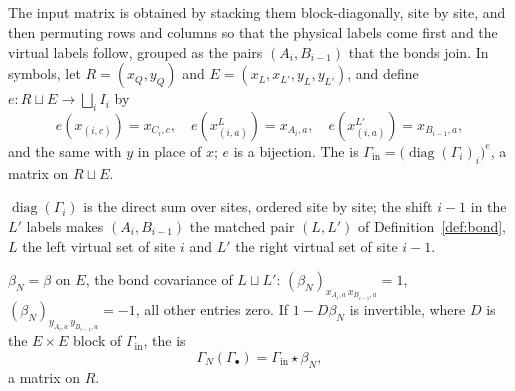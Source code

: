 \subsection{}
\begin{definition}\label{def:input}
 The input
matrix is obtained by stacking them block-diagonally, site by site, and then permuting
rows and columns so that the physical labels come first and the virtual labels follow,
grouped as the pairs $(A_i,B_{i-1})$ that the bonds join. In symbols, let
$R=(x_Q,y_Q)$ and $E=(x_L,x_{L'},y_L,y_{L'})$, and define $e:R\sqcup E\to\bigsqcup_iI_i$ by
\[
 e(x_{(i,c)})=x_{C_i,c},\quad e(x_{(i,a)}^{L})=x_{A_i,a},\quad e(x_{(i,a)}^{L'})=x_{B_{i-1},a},
\]
and the same with $y$ in place of $x$; $e$ is a bijection. The \emph{}
is $\Gamma_{\mathrm{in}}=\bigl(\operatorname{diag}(\Gamma_i)_{i}\bigr)^{e}$, a matrix
on $R\sqcup E$.
\end{definition}
$\operatorname{diag}(\Gamma_i)$ is the direct sum over sites, ordered site by site; the
shift $i-1$ in the $L'$ labels makes $(A_i,B_{i-1})$ the matched pair $(L,L')$ of
Definition~\ref{def:bond}, $L$ the left virtual set of site $i$ and $L'$ the right
virtual set of site $i-1$.

\begin{definition}\label{def:periodic}
 $\beta_N=\beta$ on $E$, the bond covariance of $L\sqcup L'$:
$(\beta_N)_{x_{A_i,a}\,x_{B_{i-1},a}}=1$, $(\beta_N)_{y_{A_i,a}\,y_{B_{i-1},a}}=-1$, all
other entries zero. If $1-D\beta_N$ is invertible, where $D$ is the $E\times E$ block of
$\Gamma_{\mathrm{in}}$, the \emph{}  is
\[
 \Gamma_N(\Gamma_\bullet)=\Gamma_{\mathrm{in}}\star\beta_N ,
\]
a matrix on $R$.
\end{definition}

